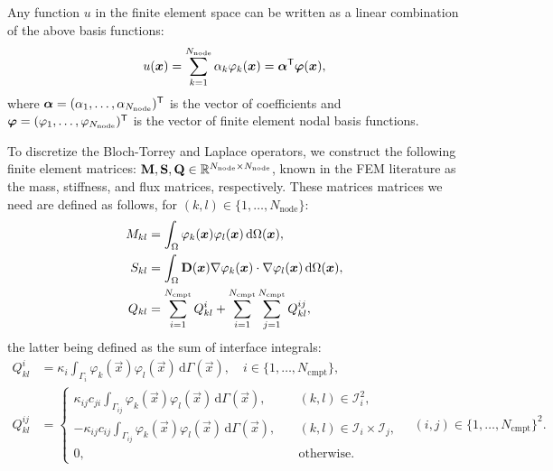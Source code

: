 \documentclass[a4paper]{article}
\begin{document}
Any function $u$ in the finite element space can be written as a linear combination of the above basis functions:
\begin{equation*}
    u(\bm{x}) = \sum_{k = 1}^{N_\text{node}} \alpha_k \varphi_k(\bm{x}) = \bm{\alpha}^{\mathsf{T}} \bm{\varphi}(\bm{x}),
\end{equation*}
where $\bm{\alpha} = (\alpha_1, \dots, \alpha_{N_\text{node}})^{\mathsf{T}}$ is the vector of coefficients and $\bm{\varphi} = (\varphi_1, \dots, \varphi_{N_\text{node}})^{\mathsf{T}}$ is the vector of finite element nodal basis functions.



To discretize the Bloch-Torrey and Laplace operators, we construct the following finite element matrices: $\mathbf{M},\mathbf{S},\mathbf{Q}\in\mathbb{R}^{N_\text{node}\times N_\text{node}}$, known in the FEM literature as the mass, stiffness, and flux matrices, respectively. These matrices matrices we need are defined as follows, for $(k, l) \in \{1, \dots, N_\text{node}\}$:
\begin{align}
    M_{kl} & = \int_\Omega \varphi_k(\bm{x}) \varphi_l(\bm{x}) \, \mathrm{d} \Omega(\bm{x}),                                      \\
    S_{kl} & = \int_\Omega \mathbf{D}(\bm{x}) \nabla \varphi_k(\bm{x}) \cdot \nabla \varphi_l(\bm{x}) \, \mathrm{d} \Omega(\bm{x}), \\
    Q_{kl} & = \sum_{i = 1}^{N_\text{cmpt}} Q_{kl}^i + \sum_{i = 1}^{N_\text{cmpt}} \sum_{j = 1}^{N_\text{cmpt}} Q_{kl}^{i j},
\end{align}
the latter being defined as the sum of interface integrals:
\begin{align}
    Q_{kl}^i     & = \kappa_i \int_{\Gamma_i} \varphi_k(\vec{x}) \varphi_l(\vec{x}) \, \mathrm{d} \Gamma(\vec{x}), \quad i \in \{1, \dots, N_\text{cmpt}\}, \\
    Q_{kl}^{i j} & =
    \begin{cases}
        \kappa_{i j} c_{j i} \int_{\Gamma_{i j}} \varphi_k(\vec{x}) \varphi_l(\vec{x}) \, \mathrm{d} \Gamma(\vec{x}), \quad  & (k, l) \in \mathcal{I}_i^2,                    \\
        -\kappa_{i j} c_{i j} \int_{\Gamma_{i j}} \varphi_k(\vec{x}) \varphi_l(\vec{x}) \, \mathrm{d} \Gamma(\vec{x}), \quad & (k, l) \in \mathcal{I}_i \times \mathcal{I}_j, \\
        0, \quad                                                                                                             & \text{otherwise}.
    \end{cases}
    \quad (i, j) \in \{1, \dots, N_\text{cmpt}\}^2.
\end{align}
\end{document}
